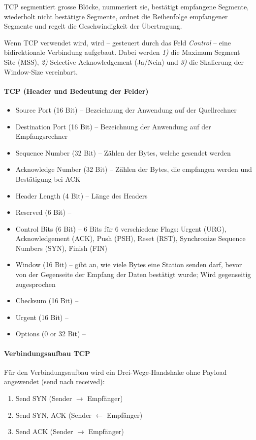 \documentclass[a4paper,12pt]{article}
\begin{document}
TCP segmentiert grosse Blöcke, nummeriert sie, bestätigt empfangene Segmente, wiederholt nicht bestätigte Segmente, ordnet die Reihenfolge empfangener Segmente und regelt die Geschwindigkeit der Übertragung. 


Wenn TCP verwendet wird, wird -- gesteuert durch das Feld \emph{Control} -- eine bidirektionale Verbindung aufgebaut. Dabei werden \emph{1)} die Maximum Segment Site (MSS), \emph{2)} Selective Acknowledgement (Ja/Nein) und \emph{3)} die Skalierung der Window-Size vereinbart.

\paragraph{TCP (Header und Bedeutung der Felder)}
\begin{itemize}
\item Source Port (16 Bit) -- Bezeichnung der Anwendung auf der Quellrechner
\item Destination Port (16 Bit) -- Bezeichnung der Anwendung auf der Empfangsrechner
\item Sequence Number (32 Bit) -- Zählen der Bytes, welche gesendet werden
\item Acknowledge Number (32 Bit) -- Zählen der Bytes, die empfangen werden und Bestätigung bei ACK
\item Header Length (4 Bit) -- Länge des Headers
\item Reserved (6 Bit) -- 
\item Control Bits (6 Bit) -- 6 Bits für 6 verschiedene Flags: Urgent (URG), Acknowledgement (ACK), Push (PSH), Reset (RST), Synchronize Sequence Numbers (SYN), Finish (FIN)
\item Window (16 Bit) -- gibt an, wie viele Bytes eine Station senden darf, bevor von der Gegenseite der Empfang der Daten bestätigt wurde; Wird gegenseitig zugesprochen
\item Checksum (16 Bit) -- 
\item Urgent (16 Bit) -- 
\item Options (0 or 32 Bit) -- 
\end{itemize} 


\paragraph{Verbindungsaufbau TCP} Für den Verbindungsaufbau wird ein Drei-Wege-Handshake ohne Payload angewendet (send nach received):
\begin{enumerate}
\item Send SYN (Sender $ \rightarrow $ Empfänger)
\item Send SYN, ACK (Sender $ \leftarrow $ Empfänger)
\item Send  ACK (Sender $ \rightarrow $ Empfänger)
\end{enumerate}
\end{document}
